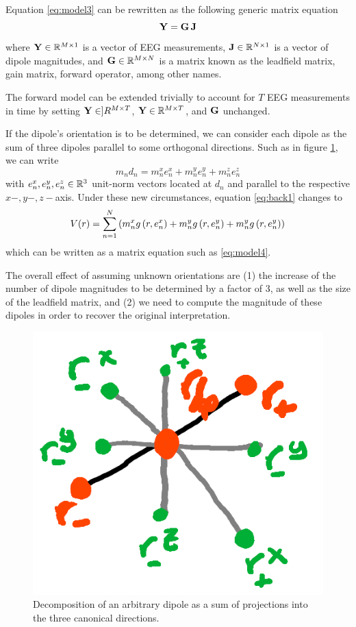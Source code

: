 Equation \eqref{eq:model3} can be rewritten as the following generic matrix equation
\begin{equation}
\mathbf{Y} = \mathbf{G}\, \mathbf{J}
\label{eq:model4}
\end{equation}
where $\mathbf{Y} \in \mathbb{R}^{M\times 1}$ is a vector of EEG measurements, $\mathbf{J} \in \mathbb{R}^{N\times 1}$ is a vector of dipole magnitudes, and $\mathbf{G} \in \mathbb{R}^{M\times N}$ is a matrix known as the leadfield matrix, gain matrix, forward operator, among other names.

The forward model can be extended trivially to account for $T$ EEG measurements in time by setting $\mathbf{Y} \in ]R^{M\times T}$, $\mathbf{Y} \in \mathbb{R}^{M\times T}$, and $\mathbf{G}$ unchanged.


If the dipole's orientation is to be determined, we can consider each dipole as the sum of three dipoles parallel to some orthogonal directions. Such as in figure \ref{fig:diagrams3}, we can write
\begin{equation}
m_n d_n = m_n^x e_n^x + m_n^y e_n^y + m_n^z e_n^z
\end{equation}
with $e_n^x, e_n^y, e_n^z \in \mathbb{R}^3$ unit-norm vectors located at $d_n$ and parallel to the respective $x-, y-, z-$axis.
%
Under these new circumstances, equation \eqref{eq:back1} changes to
\begin{equation}
V(r) = 
\sum_{n=1}^N \left( m_n^x g\left( r, e_n^x \right) + m_n^y g\left( r, e_n^y \right) + m_n^y g\left( r, e_n^y \right)
 \right)
\end{equation}
which can be written as a matrix equation such as \eqref{eq:model4}.

The overall effect of assuming unknown orientations are (1) the increase of the number of dipole magnitudes to be determined by a factor of 3, as well as the size of the leadfield matrix, and (2)
we need to compute the magnitude of these dipoles in order to recover the original interpretation.

\begin{figure}
\centering
\includegraphics[width=0.4\linewidth]{./img_dev/nsOrthDecomp}
\caption{Decomposition of an arbitrary dipole as a sum of projections into the three canonical directions.}
\label{fig:diagrams3}
\end{figure}

